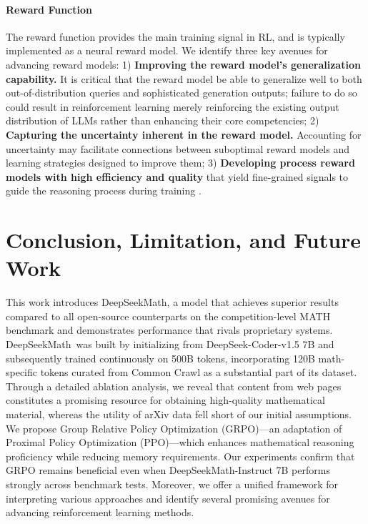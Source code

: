 \begin{itemize}[topsep=0pt]
\begin{itemize}[topsep=0pt]
\paragraph{Reward Function} The reward function provides the main training signal in RL, and is typically implemented as a neural reward model. We identify three key avenues for advancing reward models: 1) \textbf{Improving the reward model’s generalization capability.} It is critical that the reward model be able to generalize well to both out-of-distribution queries and sophisticated generation outputs; failure to do so could result in reinforcement learning merely reinforcing the existing output distribution of LLMs rather than enhancing their core competencies; 2) \textbf{Capturing the uncertainty inherent in the reward model.} Accounting for uncertainty may facilitate connections between suboptimal reward models and learning strategies designed to improve them; 3) \textbf{Developing process reward models with high efficiency and quality} that yield fine-grained signals to guide the reasoning process during training \citep{lightman2023let,wang2023math}.

\section{Conclusion, Limitation, and Future Work} This work introduces DeepSeekMath, a model that achieves superior results compared to all open-source counterparts on the competition-level MATH benchmark and demonstrates performance that rivals proprietary systems. DeepSeekMath~was built by initializing from DeepSeek-Coder-v1.5 7B and subsequently trained continuously on 500B tokens, incorporating 120B math-specific tokens curated from Common Crawl as a substantial part of its dataset. Through a detailed ablation analysis, we reveal that content from web pages constitutes a promising resource for obtaining high-quality mathematical material, whereas the utility of arXiv data fell short of our initial assumptions. We propose Group Relative Policy Optimization (GRPO)—an adaptation of Proximal Policy Optimization (PPO)—which enhances mathematical reasoning proficiency while reducing memory requirements. Our experiments confirm that GRPO remains beneficial even when DeepSeekMath-Instruct 7B performs strongly across benchmark tests. Moreover, we offer a unified framework for interpreting various approaches and identify several promising avenues for advancing reinforcement learning methods.


\end{itemize}
\end{itemize}
